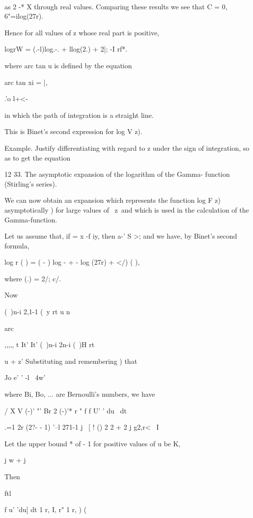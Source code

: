 \ \ %

as 2 -* X through real values. Comparing these results we see that C =
0, 6"=ilog(27r).

Hence for all values of z whose real part is positive,

logrW = (.-l)log.-. + llog(2.) + 2|; -I rf*.

where arc tan u is defined by the equation

arc tan xi = |,

.'o l+<-

in which the path of integration is a straight line.

This is Binet's second expression for log V z).

Example. Justify differentiating with regard to z under the sign of
integration, so as to get the equation

12 33. The asymptotic expansion of the logarithm of the Gamma-
function (Stirling's series).

We can now obtain an expansion which represents the function log F z)
asymptotically ) for large values of \ z\, and which is used in
the calculation of the Gamma-function.

Let us assume that, if = x -f iy, then a-' S >; and we have, by
Binet's second formula,

log r ( ) = ( - ) log - + - log (27r) + </) ( ),

where (.) = 2/; c/.

Now

(\ )n-i 2,1-1 (\ y rt u n

arc

,,,,, t It' It' (\ )n-i 2n-i (\ )H rt

u + z' Substituting and remembering ) that

Jo e' ' -l ~4w'

%
%

where Bi, Bo, ... are Bernoulli's numbers, we have

  / X V (-)' "' Br 2 (-)'* r " f f U' ' du \ dt

.=1 2r (2?- - 1) '--l 271-1 j \ [ ! () 2 2 + 2 j g2,r< \ I

Let the upper bound * of - 1 for positive values of u be K,

j w + j

Then

ftl

f u' 'du] dt 1 r, I, r" 1 r, ) (

